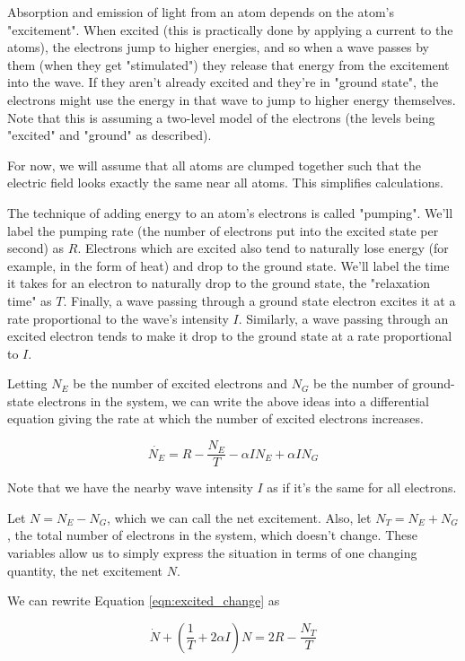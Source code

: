 \documentclass{article}
\begin{document}
Absorption and emission of light from an atom depends on the atom's "excitement". When excited (this is practically done by applying a current to the atoms), the electrons jump to higher energies, and so when a wave passes by them (when they get "stimulated") they release that energy from the excitement into the wave. If they aren't already excited and they're in "ground state", the electrons might use the energy in that wave to jump to higher energy themselves. Note that this is assuming a two-level model of the electrons (the levels being "excited" and "ground" as described).

For now, we will assume that all atoms are clumped together such that the electric field looks exactly the same near all atoms. This simplifies calculations.

The technique of adding energy to an atom's electrons is called "pumping". We'll label the pumping rate (the number of electrons put into the excited state per second) as $R$. Electrons which are excited also tend to naturally lose energy (for example, in the form of heat) and drop to the ground state. We'll label the time it takes for an electron to naturally drop to the ground state, the "relaxation time" as $T$. Finally, a wave passing through a ground state electron excites it at a rate proportional to the wave's intensity $I$. Similarly, a wave passing through an excited electron tends to make it drop to the ground state at a rate proportional to $I$.

Letting $N_E$ be the number of excited electrons and $N_G$ be the number of ground-state electrons in the system, we can write the above ideas into a differential equation giving the rate at which the number of excited electrons increases.

\begin{equation}\label{eqn:excited_change}
    \dot{N_E} = R - \frac{N_E}{T} - \alpha I N_E + \alpha I N_G
\end{equation}

Note that we have the nearby wave intensity $I$ as if it's the same for all electrons.

Let $N = N_E - N_G$, which we can call the net excitement. Also, let $N_T = N_E + N_G$, the total number of electrons in the system, which doesn't change. These variables allow us to simply express the situation in terms of one changing quantity, the net excitement $N$.

We can rewrite Equation \ref{eqn:excited_change} as

\begin{equation}\label{eqn:Ndiff}
    \dot{N} + (\frac{1}{T} + 2\alpha I)N = 2R - \frac{N_T}{T}
\end{equation}
\end{document}
